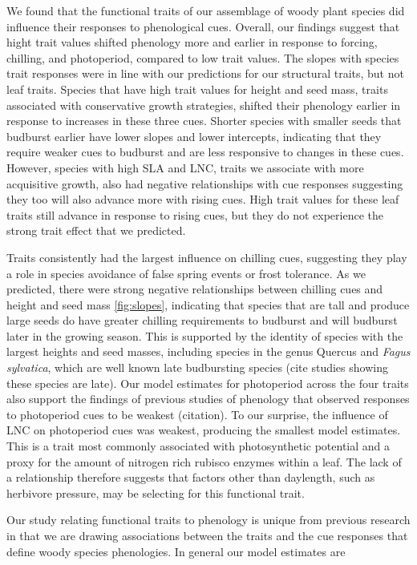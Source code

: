 \documentclass{article}\usepackage[]{graphicx}\usepackage[]{color}
\begin{document}
We found that the functional traits of our assemblage of woody plant species did influence their responses to phenological cues. Overall, our findings suggest that hight trait values shifted phenology more and earlier in response to forcing, chilling, and photoperiod, compared to low trait values. The slopes with species trait responses were in line with our predictions for our structural traits, but not leaf traits. Species that have high trait values for height and seed mass, traits associated with conservative growth strategies, shifted their phenology earlier in response to increases in these three cues. Shorter species with smaller seeds that budburst earlier have lower slopes and lower intercepts, indicating that they require weaker cues to budburst and are less responsive to changes in these cues. However, species with high SLA and LNC, traits we associate with more acquisitive growth, also had negative relationships with cue responses suggesting they too will also advance more with rising cues. High trait values for these leaf traits still advance in response to rising cues, but they do not experience the strong trait effect that we predicted. 

Traits consistently had the largest influence on chilling cues, suggesting they play a role in species avoidance of false spring events or frost tolerance. As we predicted, there were strong negative relationships between chilling cues and height and seed mass \ref{fig:slopes}, indicating that species that are tall and produce large seeds do have greater chilling requirements to budburst and will budburst later in the growing season. This is supported by the identity of species with the largest heights and seed masses, including species in the genus Quercus and \textit{Fagus sylvatica}, which are well known late budbursting species (cite studies showing these species are late). %
 Our model estimates for photoperiod across the four traits also support the findings of previous studies of phenology that observed responses to photoperiod cues to be weakest (citation). To our surprise, the influence of LNC on photoperiod cues was weakest, producing the smallest model estimates. This is a trait most commonly associated with photosynthetic potential and a proxy for the amount of nitrogen rich rubisco enzymes within a leaf. The lack of a relationship therefore suggests that factors other than daylength, such as herbivore pressure, may be selecting for this functional trait.
 
 Our study relating functional traits to phenology is unique from previous research in that we are drawing associations between the traits and the cue responses that define woody species phenologies. In general our model estimates are   
\end{document}
